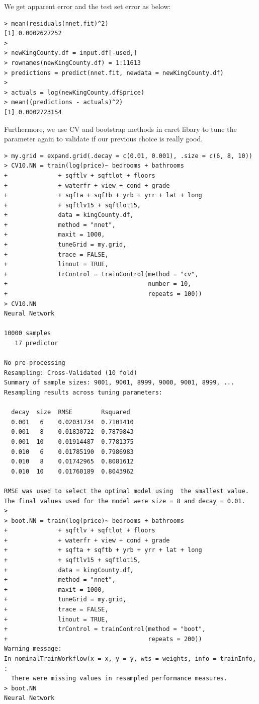 \documentclass{article}%
\begin{document}
We get apparent error and the test set error as below:
\begin{verbatim}
> mean(residuals(nnet.fit)^2)
[1] 0.0002627252
> 
> newKingCounty.df = input.df[-used,]
> rownames(newKingCounty.df) = 1:11613
> predictions = predict(nnet.fit, newdata = newKingCounty.df)
> 
> actuals = log(newKingCounty.df$price)
> mean((predictions - actuals)^2)
[1] 0.0002723154
\end{verbatim}

Furthermore, we use CV and bootstrap methods in caret libary to tune the parameter again to validate if our previous choice is really good.
\begin{verbatim}
> my.grid = expand.grid(.decay = c(0.01, 0.001), .size = c(6, 8, 10))
> CV10.NN = train(log(price)~ bedrooms + bathrooms
+              + sqftlv + sqftlot + floors 
+              + waterfr + view + cond + grade 
+              + sqfta + sqftb + yrb + yrr + lat + long
+              + sqftlv15 + sqftlot15,
+              data = kingCounty.df,
+              method = "nnet", 
+              maxit = 1000,
+              tuneGrid = my.grid,
+              trace = FALSE,
+              linout = TRUE,
+              trControl = trainControl(method = "cv", 
+                                       number = 10, 
+                                       repeats = 100))
> CV10.NN
Neural Network 

10000 samples
   17 predictor

No pre-processing
Resampling: Cross-Validated (10 fold) 
Summary of sample sizes: 9001, 9001, 8999, 9000, 9001, 8999, ... 
Resampling results across tuning parameters:

  decay  size  RMSE        Rsquared 
  0.001   6    0.02031734  0.7101410
  0.001   8    0.01830722  0.7879843
  0.001  10    0.01914487  0.7781375
  0.010   6    0.01785190  0.7986983
  0.010   8    0.01742965  0.8081612
  0.010  10    0.01760189  0.8043962

RMSE was used to select the optimal model using  the smallest value.
The final values used for the model were size = 8 and decay = 0.01. 
> 
> boot.NN = train(log(price)~ bedrooms + bathrooms
+              + sqftlv + sqftlot + floors 
+              + waterfr + view + cond + grade 
+              + sqfta + sqftb + yrb + yrr + lat + long
+              + sqftlv15 + sqftlot15,
+              data = kingCounty.df,
+              method = "nnet", 
+              maxit = 1000,
+              tuneGrid = my.grid,
+              trace = FALSE,
+              linout = TRUE,
+              trControl = trainControl(method = "boot", 
+                                       repeats = 200))
Warning message:
In nominalTrainWorkflow(x = x, y = y, wts = weights, info = trainInfo,  :
  There were missing values in resampled performance measures.
> boot.NN
Neural Network 


\end{verbatim}
\end{document}
